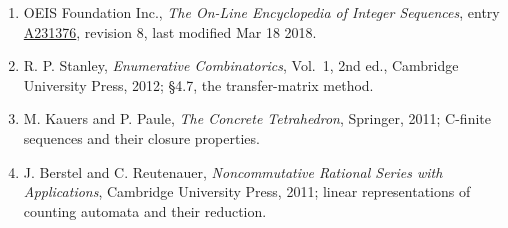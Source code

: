 \documentclass[11pt]{article}
\theoremstyle{definition}
\begin{document}
\begin{enumerate}

\item OEIS Foundation Inc., \emph{The On-Line Encyclopedia of Integer Sequences}, entry \href{https://oeis.org/A231376}{A231376}, revision 8, last modified Mar 18 2018.

\item R. P. Stanley, \emph{Enumerative Combinatorics}, Vol.~1, 2nd ed., Cambridge University Press, 2012; \S4.7, the transfer-matrix method.

\item M. Kauers and P. Paule, \emph{The Concrete Tetrahedron}, Springer, 2011; C-finite sequences and their closure properties.

\item J. Berstel and C. Reutenauer, \emph{Noncommutative Rational Series with Applications}, Cambridge University Press, 2011; linear representations of counting automata and their reduction.

\end{enumerate}
\end{document}
